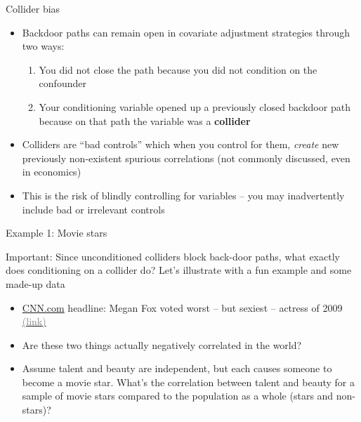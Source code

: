 \documentclass{beamer}
\newcommand{\myurlshort}[2]{\href{#1}{\textcolor{gray}{\textsf{#2}}}}
\begin{document}
\begin{frame}{Collider bias}

\begin{itemize}
\item Backdoor paths can remain open in covariate adjustment strategies through two ways:
	\begin{enumerate}
	\item You did not close the path because you did not condition on the confounder
	\item Your conditioning variable opened up a previously closed backdoor path because on that path the variable was a \textbf{collider}
	\end{enumerate}
\item Colliders are ``bad controls'' which when you control for them, \emph{create} new previously non-existent spurious correlations (not commonly discussed, even in economics)
\item This is the risk of blindly controlling for variables -- you may inadvertently include bad or irrelevant controls
\end{itemize}

\end{frame}


\begin{frame}{Example 1: Movie stars}

  \alert{Important}: Since unconditioned colliders block back-door paths, what exactly does conditioning on a collider do? Let's illustrate with a fun example and some made-up data\\
  \begin{itemize}
    \item \underline{CNN.com} headline: Megan Fox voted worst -- but sexiest -- actress of 2009 \myurlshort{http://marquee.blogs.cnn.com/2009/12/30/megan-fox-voted-worst-but-sexiest-actress-of-2009/}{(link)}
    \item Are these two things actually negatively correlated in the world?
    \item Assume talent and beauty are independent, but each causes someone to become a movie star.  What's the correlation between talent and beauty for a sample of movie stars compared to the population as a whole (stars and non-stars)?
  \end{itemize}

\end{frame}
\end{document}
